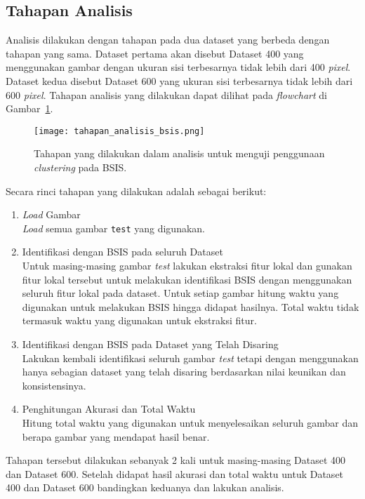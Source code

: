 \subsection{Tahapan Analisis}
Analisis dilakukan dengan tahapan pada dua dataset yang berbeda dengan tahapan yang sama. Dataset pertama akan disebut Dataset 400 yang menggunakan gambar dengan ukuran sisi terbesarnya tidak lebih dari 400 \textit{pixel}. Dataset kedua disebut Dataset 600 yang ukuran sisi terbesarnya tidak lebih dari 600 \textit{pixel}. Tahapan analisis yang dilakukan dapat dilihat pada \textit{flowchart} di Gambar~\ref{fig:tahapan_analisis_bsis}.
\begin{figure}
	\centering
	\texttt{[image: tahapan\_analisis\_bsis.png]}
	\caption{Tahapan yang dilakukan dalam analisis untuk menguji penggunaan \textit{clustering} pada BSIS.}
	\label{fig:tahapan_analisis_bsis}
\end{figure}
Secara rinci tahapan yang dilakukan adalah sebagai berikut:
\begin{enumerate}
	\item \textit{Load} Gambar \\
	\textit{Load} semua gambar \texttt{test} yang digunakan.
	\item Identifikasi dengan BSIS pada seluruh Dataset \\
	Untuk masing-masing gambar \textit{test} lakukan ekstraksi fitur lokal dan gunakan fitur lokal tersebut untuk melakukan identifikasi BSIS dengan menggunakan seluruh fitur lokal pada dataset. Untuk setiap gambar hitung waktu yang digunakan untuk melakukan BSIS hingga didapat hasilnya. Total waktu tidak termasuk waktu yang digunakan untuk ekstraksi fitur.
	\item Identifikasi dengan BSIS pada Dataset yang Telah Disaring \\
	Lakukan kembali identifikasi seluruh gambar \textit{test} tetapi dengan menggunakan hanya sebagian dataset yang telah disaring berdasarkan nilai keunikan dan konsistensinya.
	\item Penghitungan Akurasi dan Total Waktu \\
	Hitung total waktu yang digunakan untuk menyelesaikan seluruh gambar dan berapa gambar yang mendapat hasil benar.
\end{enumerate}
Tahapan tersebut dilakukan sebanyak 2 kali untuk masing-masing Dataset 400 dan Dataset 600. Setelah didapat hasil akurasi dan total waktu untuk Dataset 400 dan Dataset 600 bandingkan keduanya dan lakukan analisis.

